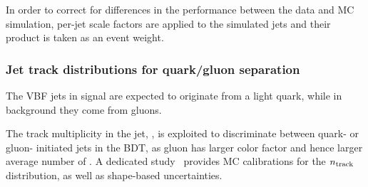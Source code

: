 
In order to correct for differences in the \btagging performance between the data and MC simulation, per-jet scale factors are applied to the simulated jets and their product is taken as an event weight.

\subsubsection{Jet track distributions for quark/gluon separation}
\label{sec:vbf-qgtagging}

The VBF jets in signal are expected to originate from a light quark, 
while in background they come from gluons.

The track multiplicity in the jet, \ntrk, is exploited to discriminate between quark- or gluon- initiated jets in the BDT, as gluon has larger color factor and hence larger average number of \ntrk. A dedicated study~\cite{qgtagging}  provides MC calibrations for the $n_{\rm track}$ distribution, as well as shape-based uncertainties.

